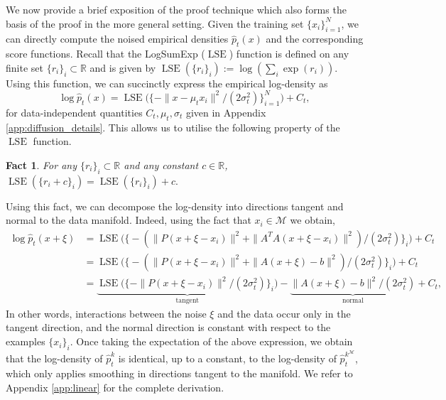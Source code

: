 \documentclass[10pt]{article}
\theoremstyle{plain}
\newtheorem{fact}[theorem]{Fact}
\theoremstyle{definition}
\theoremstyle{remark}
\newcommand{\M}{{\mathcal{M}}}
\newcommand{\R}{\mathbb{R}}
\newcommand{\lse}{\operatorname{LSE}}
\begin{document}
We now provide a brief exposition of the proof technique which also forms the basis of the proof in the more general setting. Given the training set $\{x_i\}_{i = 1}^N$, we can directly compute the noised empirical densities $\hat{p}_t(x)$ and the corresponding score functions. Recall that the LogSumExp ($\lse$) function is defined on any finite set \(\{r_i\}_i \subset \R\) and is given by \(\lse(\{r_i\}_i) := \log(\sum_i \exp(r_i))\). Using this function, we can succinctly express the empirical log-density as
\begin{equation}\label{eqn:emp_density_lse}
    \log \hat{p}_t(x) = \lse \Big ( \big \{ - \|x - \mu_t x_i\|^2/(2 \sigma^2_t) \big \}_{i=1}^N \Big ) +C_t,
\end{equation}
for data-independent quantities \(C_t, \mu_t, \sigma_t\) given in Appendix \ref{app:diffusion_details}. This allows us to utilise the following property of the \(\lse\) function.
\begin{fact}\label{fact:lse_shift}
For any \(\{r_i\}_i \subset \R\) and any constant \(c \in \R\), $ \lse(\{r_i + c\}_i) = \lse(\{r_i\}_i) + c.$
\end{fact}

Using this fact, we can decompose the log-density into directions tangent and normal to the data manifold. Indeed, using the fact that \(x_i \in \M\) we obtain,
\begin{align}
    \log \hat{p}_t(x + \xi) &= \lse \Big ( \big \{ -(\|P(x + \xi - x_i)\|^2 + \|A^T A(x + \xi - x_i)\|^2)/(2 \sigma_t^2) \big\}_{i} \Big ) + C_t \nonumber \\
    &= \lse \Big ( \big \{ -(\|P(x + \xi - x_i)\|^2 + \|A(x + \xi) - b\|^2)/(2 \sigma_t^2) \big\}_{i} \Big ) + C_t \nonumber \\
    &= \underbrace{\lse \Big ( \big \{ -\|P(x + \xi - x_i)\|^2/(2 \sigma_t^2) \big\}_{i} \Big )}_{\text{tangent}} 
    - \underbrace{\|A(x + \xi) - b\|^2 / (2 \sigma_t^2)}_{\text{normal}} + C_t,\label{eqn:tang_norm_decomp}
\end{align}
In other words, interactions between the noise \(\xi\) and the data occur only in the tangent direction, and the normal direction is constant with respect to the examples \(\{x_i\}_i\). Once taking the expectation of the above expression, we obtain that the log-density of \(\hat{p}_t^k\) is identical, up to a constant, to the log-density of \(\hat{p}^{k^\M}_t\), which only applies smoothing in directions tangent to the manifold. We refer to Appendix \ref{app:linear} for the complete derivation.
\end{document}
